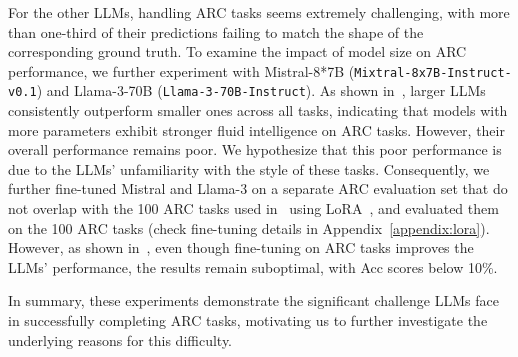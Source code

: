 For the other LLMs, handling ARC tasks seems extremely challenging, with more than one-third of their predictions failing to match the shape of the corresponding ground truth. To examine the impact of model size on ARC performance, we further experiment with Mistral-8*7B (\texttt{Mixtral-8x7B-Instruct-v0.1}) and Llama-3-70B (\texttt{Llama-3-70B-Instruct}). As shown in~, larger LLMs consistently outperform smaller ones across all tasks, indicating that models with more parameters exhibit stronger fluid intelligence on ARC tasks. However, their overall performance remains poor. We hypothesize that this poor performance is due to the LLMs' unfamiliarity with the style of these tasks. Consequently, we further fine-tuned Mistral and Llama-3 on a separate ARC evaluation set that do not overlap with the 100 ARC tasks used in~ using LoRA~\cite{hu2021lora}, and evaluated them on the 100 ARC tasks (check fine-tuning details in Appendix~\ref{appendix:lora}). However, as shown in~, even though fine-tuning on ARC tasks improves the LLMs' performance, the results remain suboptimal, with Acc scores below 10\%.

 

In summary, these experiments demonstrate the significant challenge LLMs face in successfully completing ARC tasks, motivating us to further investigate the underlying reasons for this difficulty.




